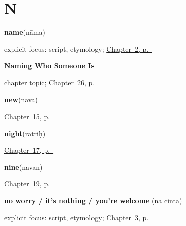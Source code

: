\section*{N}

\noindent\begin{minipage}[t]{\linewidth}
\raggedright
\textbf{name}\enspace\emph{}\enspace(nāma)\par
\footnotesize explicit focus: script, etymology; \hyperref[ch:introductions]{Chapter~2, p.~\pageref*{ch:introductions}}
\end{minipage}\par\smallskip

\noindent\begin{minipage}[t]{\linewidth}
\raggedright
\textbf{Naming Who Someone Is}\par
\footnotesize chapter topic; \hyperref[ch:sa-roles]{Chapter~26, p.~\pageref*{ch:sa-roles}}
\end{minipage}\par\smallskip

\noindent\begin{minipage}[t]{\linewidth}
\raggedright
\textbf{new}\enspace\emph{}\enspace(nava)\par
\footnotesize \hyperref[ch:sa-describing-things]{Chapter~15, p.~\pageref*{ch:sa-describing-things}}
\end{minipage}\par\smallskip

\noindent\begin{minipage}[t]{\linewidth}
\raggedright
\textbf{night}\enspace\emph{}\enspace(rātriḥ)\par
\footnotesize \hyperref[ch:sa-time]{Chapter~17, p.~\pageref*{ch:sa-time}}
\end{minipage}\par\smallskip

\noindent\begin{minipage}[t]{\linewidth}
\raggedright
\textbf{nine}\enspace\emph{}\enspace(navan)\par
\footnotesize \hyperref[ch:sa-numbers-6-10]{Chapter~19, p.~\pageref*{ch:sa-numbers-6-10}}
\end{minipage}\par\smallskip

\noindent\begin{minipage}[t]{\linewidth}
\raggedright
\textbf{no worry / it's nothing / you're welcome}\enspace\emph{ }\enspace(na cintā)\par
\footnotesize explicit focus: script, etymology; \hyperref[ch:responding]{Chapter~3, p.~\pageref*{ch:responding}}
\end{minipage}\par\smallskip

